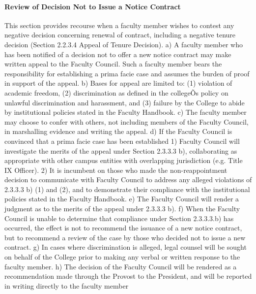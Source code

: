 \documentclass[letterpaper, 11pt]{article}
\begin{document}
			\paragraph{Review of Decision Not to Issue a Notice Contract}
				This section provides recourse when a faculty member wishes to contest any negative decision concerning renewal of contract, including a negative tenure decision (Section 2.2.3.4 Appeal of Tenure Decision).
				a) A faculty member who has been notified of a decision not to offer a new notice contract may make written appeal to the Faculty Council.  Such a faculty member bears the responsibility for establishing a prima facie case and assumes the burden of proof in support of the appeal.
				b) Bases for appeal are limited to: (1) violation of academic freedom, (2) discrimination as defined in the collegeÕs policy on unlawful discrimination and harassment, and (3) failure by the College to abide by institutional policies stated in the Faculty Handbook.
				c) The faculty member may choose to confer with others, not including members of the Faculty Council, in marshalling evidence and writing the appeal.
				d) If the Faculty Council is convinced that a prima facie case has been established
				1) Faculty Council will investigate the merits of the appeal under Section 2.3.3.3 b), collaborating as appropriate with other campus entities with overlapping jurisdiction (e.g. Title IX Officer).
				2) It is incumbent on those who made the non-reappointment decision to communicate with Faculty Council to address any alleged violations of 2.3.3.3 b) (1) and (2), and to demonstrate their compliance with the institutional policies stated in the Faculty Handbook.
				e) The Faculty Council will render a judgment as to the merits of the appeal under 2.3.3.3 b).
				f) When the Faculty Council is unable to determine that compliance under Section 2.3.3.3.b) has occurred, the effect is not to recommend the issuance of a new notice contract, but to recommend a review of the case by those who decided not to issue a new contract.
				g) In cases where discrimination is alleged, legal counsel will be sought on behalf of the College prior to making any verbal or written response to the faculty member.
				h) The decision of the Faculty Council will be rendered as a recommendation made through the Provost to the President, and will be reported in writing directly to the faculty member
\end{document}

